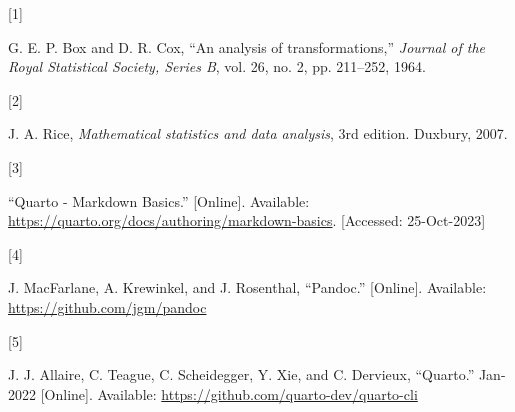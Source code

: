 \documentclass[
  journal,
]{IEEEtran}%
\newlength{\cslhangindent}
\newlength{\csllabelwidth}
\newenvironment{CSLReferences}[2] %
 {\begin{list}{}{%
  \setlength{\itemindent}{0pt}
  \setlength{\leftmargin}{0pt}
  \setlength{\parsep}{0pt}
  \ifodd #1
   \setlength{\leftmargin}{\cslhangindent}
   \setlength{\itemindent}{-1\cslhangindent}
  \fi
  \setlength{\itemsep}{#2\baselineskip}}}
 {\end{list}}
\newcommand{\CSLLeftMargin}[1]{\parbox[t]{\csllabelwidth}{\strut#1\strut}}
\newcommand{\CSLRightInline}[1]{\parbox[t]{\linewidth - \csllabelwidth}{\strut#1\strut}}
\providecommand{\bibfont}{\footnotesize}
\begin{document}
\label{refs}
\begin{CSLReferences}{0}{0}
\CSLLeftMargin{{[}1{]} }%
\CSLRightInline{G. E. P. Box and D. R. Cox, {``An analysis of
transformations,''} \emph{Journal of the Royal Statistical Society,
Series B}, vol. 26, no. 2, pp. 211--252, 1964. }

\CSLLeftMargin{{[}2{]} }%
\CSLRightInline{J. A. Rice, \emph{Mathematical statistics and data
analysis}, 3rd edition. Duxbury, 2007. }

\CSLLeftMargin{{[}3{]} }%
\CSLRightInline{{``Quarto - {Markdown Basics}.''} {[}Online{]}.
Available: \url{https://quarto.org/docs/authoring/markdown-basics}.
{[}Accessed: 25-Oct-2023{]}}

\CSLLeftMargin{{[}4{]} }%
\CSLRightInline{J. MacFarlane, A. Krewinkel, and J. Rosenthal,
{``{Pandoc}.''} {[}Online{]}. Available:
\url{https://github.com/jgm/pandoc}}

\CSLLeftMargin{{[}5{]} }%
\CSLRightInline{J. J. Allaire, C. Teague, C. Scheidegger, Y. Xie, and C.
Dervieux, {``{Quarto}.''} Jan-2022 {[}Online{]}. Available:
\url{https://github.com/quarto-dev/quarto-cli}}

\end{CSLReferences}


\ifCLASSOPTIONcaptionsoff
  \newpage
\fi



\pagebreak[3]
\end{document}
